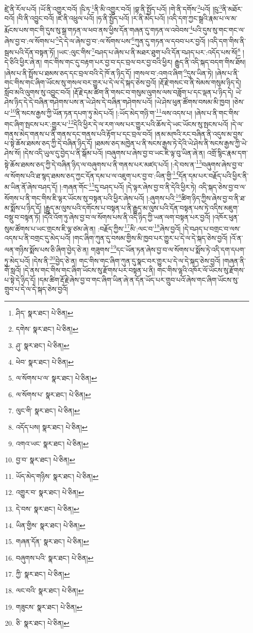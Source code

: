 ཛྲེ་ནི་རོལ་པའོ། །ཡོ་ནི་འགྱུར་བའོ། །ཥི་ཏ་\footnote{ཤིད་  སྣར་ཐང་།  པེ་ཅིན། }ནི་མི་འགྱུར་བའོ། །བྷ་ནི་སྤྱོད་པའོ། །གེ་ནི་དགོས་\footnote{དགེས་  སྣར་ཐང་།  པེ་ཅིན། }པའོ། །ཥུ་\footnote{ཤུ་  སྣར་ཐང་།  པེ་ཅིན། }ནི་མཐོར་བའོ། །བི་ནི་འབྱུང་བའོ། །ཛ་ནི་འཕྲུལ་པའོ། །ཧ་ནི་སྤྱོད་པའོ། །ར་ནི་མེད་པའོ། །འདི་དག་ཀྱང་སྒྲའི་རྣམ་པ་ལ་མ་རྨོངས་པས་གང་གི་དུས་སུ་སྒྲ་གཏན་ལ་ཕབ་ནས་ཕྱིས་དོན་གཞན་དུ་གཏན་ལ་འབེབས་\footnote{ཕེབ་  སྣར་ཐང་།  པེ་ཅིན། }པའི་དུས་སུ་གང་གང་ལ་ཞེས་བྱ་བ་:ལ་སོགས་པ་\footnote{ལ་སོགས་པ་ལ་  སྣར་ཐང་།  པེ་ཅིན། }དེ་དེ་ལ་ཞེས་བྱ་བ་:ལ་སོགས་པས་\footnote{ལ་སོགས་པ་  སྣར་ཐང་།  པེ་ཅིན། }ཀུན་དུ་གཏན་ལ་དབབ་པར་བྱའོ། །འདི་དག་གིས་ནི་སྦས་པའི་དོན་བསྟན་ཏོ། །ཡང་:ལུང་གིས་\footnote{ལུང་གི་  སྣར་ཐང་།  པེ་ཅིན། }བཤད་པ་ཞེས་པ་ནི་མཐར་ཐུག་པའི་དོན་བཤད་པར་:འདོད་པས་སོ།\footnote{འདོད་པས།  སྣར་ཐང་།  པེ་ཅིན། } །དེ་ཅིའི་ཕྱིར་ཞེ་ན། གང་གིས་གང་དུ་བརྟག་པར་བྱ་བ་དང་བྲལ་བར་བྱ་བའི་ཕྱིར། རྒྱུད་ནི་འདི་སྐད་བདག་གིས་ཐོས། །ཞེས་པ་ནི་སྤྲོས་པ་ཐམས་ཅད་དང་བྲལ་བའི་དེ་ཁོ་ན་ཉིད་དོ། །གསལ་བ་:འགའ་ཞིག་\footnote{འགའ་ཡང་  སྣར་ཐང་།  པེ་ཅིན། }དུས་ཡིན་ཏེ། །ཞེས་པ་ནི་གང་གིས་གང་ཞིག་ཡོངས་སུ་གསལ་བར་གྱུར་པ་དེ་ལ་དེ་སྐད་ཅེས་བྱའོ། །རྡོ་རྗེ་གསང་བ་ནི་སེམས་གསུམ་ཉིད་དེ། སློབ་མའི་ལུགས་སུ་འབྱུང་བའོ། །རྡོ་རྗེ་དམ་ཚིག་ནི་གསང་བ་གསུམ་ལུགས་ལས་བཟློག་པ་དང་ལྡན་པ་ཉིད་དེ། ཡེ་ཤེས་ཉིད་དེ་དེ་བཞིན་གཤེགས་པས་ན་ཡེ་ཤེས་དེ་བཞིན་གཤེགས་པའོ། །ཡེ་ཤེས་ཕུན་ཚོགས་བསམ་མི་ཁྱབ། །ཅེས་པ་\footnote{བྱ་བ་  སྣར་ཐང་།  པེ་ཅིན། }ནི་སངས་རྒྱས་ཀྱི་ཡོན་ཏན་དཔག་ཏུ་མེད་པའོ། །:ཡོད་མེད་གཉི་ག་\footnote{ཡོད་མེད་གཉིས་  སྣར་ཐང་།  པེ་ཅིན། }ལས་འདས་པ། །ཞེས་པ་ནི་གང་གིས་གང་ཞིག་སྤངས་པར་:གྱུར་པ་\footnote{འགྱུར་བ་  སྣར་ཐང་།  པེ་ཅིན། }དེའི་ཕྱིར་དེ་ལ་རག་ལས་པར་གྱུར་པའི་ཆོས་དེ་ཡང་ཡོངས་སུ་སྤངས་པའོ། །དེ་ལ་གནས་མེད་གནས་པ་ནི་གནས་དང་གནས་པའི་རྟོག་པ་དང་བྲལ་བའོ། །ནམ་མཁའི་རང་བཞིན་ནི་འདུས་མ་བྱས་པ་སྟེ་ཆོས་ཐམས་ཅད་ཀྱི་དེ་བཞིན་ཉིད་དོ། །ཐམས་ཅད་མཁྱེན་པ་ནི་སངས་རྒྱས་ཏེ་དེའི་ཡེ་ཤེས་ནི་སངས་རྒྱས་ཀྱི་ཡེ་ཤེས་སོ། །དེས་འདི་ཡུལ་དུ་བྱེད་པ་ནི་སྒོམ་པའོ། །བཞུགས་པ་ཞེས་བྱ་བ་ཡང་ཇི་ལྟ་བུ་ཡིན་ཞེ་ན། འགྲོ་སྙིང་རྣམ་དག་སྟེ་ཆོས་ཐམས་ཅད་ཀྱི་དེ་བཞིན་ཉིད་ལ་བཞུགས་པ་ནི་གནས་པར་མཛད་པའོ། །:དེ་བས་ན་\footnote{དེ་བས་  སྣར་ཐང་།  པེ་ཅིན། }བཞུགས་ཞེས་བྱ་བ་ལ་སོགས་པའི་ཐ་སྙད་ཐམས་ཅད་ཀྱང་དོན་དམ་པ་ལ་འཇུག་པར་བྱ་བ་:ཡིན་གྱི་\footnote{ཡིན་གྱིས་  སྣར་ཐང་།  པེ་ཅིན། }དོན་དམ་པར་བརྗོད་པའི་ཕྱིར་ནི་མ་ཡིན་ནོ་ཞེས་བཤད་དོ། །:གཞན་གོང་\footnote{གཞན་དོན་  སྣར་ཐང་།  པེ་ཅིན། }དུ་བཤད་པའོ། །དེ་ལྟར་ཞེས་བྱ་བ་ནི་དེའི་ཕྱིར་ཏེ། འདི་སྐད་ཅེས་བྱ་བ་ལ་སོགས་པ་ནི་གང་གིས་ཇི་ལྟར་ཡོངས་སུ་བསྟན་པའི་ཕྱིར་ཞེས་པའོ། །:ཞུགས་པའི་\footnote{བཞུགས་པའི་  སྣར་ཐང་།  པེ་ཅིན། }ཚིག་ཉིད་ཀྱིས་ཞེས་བྱ་བ་ནི་ཐ་མ་སྨོས་པ་ཉིད་དོ། །རྒྱུད་མ་ལུས་པའི་དགོངས་པ་བསྟན་པ་ནི་རྒྱུད་མ་ལུས་པའི་དོན་བསྟན་པས་ཏེ་འདིས་མཇུག་བསྡུ་བ་བསྟན་ཏོ། །དེའི་འོག་ཏུ་ཞེས་བྱ་བ་ལ་སོགས་པས་ནི་འདི་ཉིད་ཀྱི་ཡན་ལག་བསྟན་པར་བྱའོ། །འཁོར་ཕུན་སུམ་ཚོགས་པ་ཡང་གྲངས་ཇི་ལྟ་ཙམ་ཞེ་ན། :བརྗོད་ཀྱིས་\footnote{ཀྱི་  སྣར་ཐང་།  པེ་ཅིན། }མི་:ལང་བ་\footnote{ལང་བའི་  སྣར་ཐང་།  པེ་ཅིན། }ཞེས་བྱའོ། །དེ་བཤད་པ་བགྲང་བ་ལས་འདས་པ་ནི་བགྲང་དུ་མེད་པའོ། །གང་ཞིག་ཀུན་དུ་བསམ་གྱིས་མི་ཁྱབ་པར་གྱུར་པ་དེ་ལ་དེ་སྐད་ཅེས་བྱའོ། །འོ་ན་ལན་གཉིས་སྨོས་པས་ཅི་ཞིག་བྱེད་ཅེ་ན། གཟུགས་\footnote{གཟུངས་  སྣར་ཐང་།  པེ་ཅིན། }དང་ཡོན་ཏན་ཞེས་བྱ་བ་ལ་སོགས་པ་སྨོས་ཏེ་འདི་དག་དཔག་ཏུ་མེད་པའོ། །དེས་ནི་\footnote{ཅི་  སྣར་ཐང་།  པེ་ཅིན། }བྱེད་ཅེ་ན། གང་གིས་གང་ཞིག་ཀུན་དུ་སྣང་བར་གྱུར་པ་དེ་ལ་དེ་སྐད་ཅེས་བྱའོ། །གཞན་ནི་གོ་སླའོ། །དེ་ནས་གང་གིས་གང་ཞིག་ཡོངས་སུ་རྫོགས་པར་བསྟན་པ་ནི། གང་གིས་ལྷའི་འཁོར་ལོ་ཡོངས་སུ་རྫོགས་པ་སྟེ་དེ་ཉིད་དོ། །དམ་ཚིག་རྡོ་རྗེ་ཞེས་བྱ་བ་གང་ཞིག་ཡིན་ཞེ་ན་དོན་ཡོད་པར་གྲུབ་པའོ་ཞེས་གང་ཞིག་ཡོངས་སུ་གྲུབ་པ་དེ་ལ་དེ་སྐད་ཅེས་བྱའོ། 